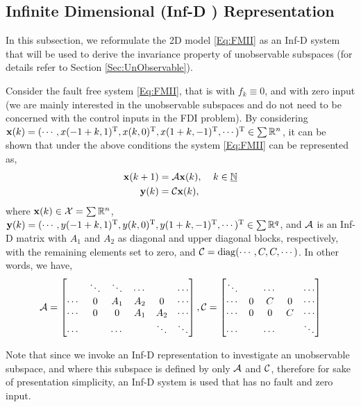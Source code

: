 \documentclass[journal,12pt,draftcls,onecolumn]{IEEEtran}
\newcommand{\tran}{\mathrm{T}}
\newcommand{\bbm}{\begin{bmatrix}}
\newcommand{\ebm}{\end{bmatrix}}
\newcommand{\diag}{\mathrm{diag}}
\newcommand{\infd}{Inf-D }
\begin{document}
\subsection{Infinite Dimensional (\infd) Representation} \label{Sec:IDRep}
In this subsection, we reformulate the 2D model \eqref{Eq:FMII} as an Inf-D system that will be used to derive the invariance property of  unobservable subspaces (for details refer to Section \ref{Sec:UnObservable}).

Consider the fault free system \eqref{Eq:FMII}, that is with $f_k\equiv0$, and with zero input (we are mainly interested in the unobservable subspaces and do not need to be concerned with the control inputs in the FDI problem). By considering  ${\bf x}(k)=(\cdots,x(-1+k,1)^\tran,x(k,0)^\tran,x(1+k,-1)^\tran,\cdots)^\tran\in\sum\fld{R}^n$, it can be shown that under the above conditions the system \eqref{Eq:FMII} can be represented as,
\begin{equation}\label{Eq:IDRep}
	\begin{split}
		{\bf x}(k+1) &= \mathcal{A}{\bf x}(k),\;\;\;\; k\in\underline{\mathbb{N}} \\
		{\bf y}(k) &=\mathcal{C}{\bf x}(k),
	\end{split}
\end{equation}
where ${\bf x}(k)\in\mathcal{X}=\sum{\mathbb{R}^n}$, ${\bf y}(k)=(\cdots,y(-1+k,1)^\tran,y(k,0)^\tran,y(1+k,-1)^\tran,\cdots)^\tran\in\sumbanach{\fld{R}^q}$, and $\mathcal{A}$ is an Inf-D matrix with $A_1$ and $A_2$ as diagonal and upper diagonal blocks, respectively, with the remaining elements set to zero, and $\op{C} = \diag(\cdots,C,C,\cdots)$. In other words, we have,
\begin{equation}
	\op{A} = \bbm \ &\ddots &\ddots &\cdots & &\cdots\\
	\cdots &0 &A_1 &A_2 &0 &\cdots\\
	\cdots &0 &0 &A_1 &A_2 &\cdots\\
	\cdots & &\cdots & &\ddots &\ddots \ebm ,
	\op{C} = \bbm \ddots & &\cdots & &\cdots\\
	\cdots &0 &C &0 &\cdots\\
	\cdots &0 &0 &C &\cdots \\
	\cdots & &\cdots & &\ddots\ebm												
\end{equation}


Note that since we invoke an Inf-D representation to investigate an unobservable subspace, and where this subspace is defined by only $\mathcal{A}$ and $\mathcal{C}$, therefore for sake of  presentation simplicity,  an Inf-D system is used that has no fault and zero input. 
\end{document}
